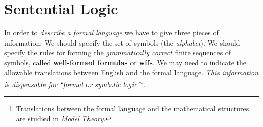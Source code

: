 \documentclass{myproc}
\begin{document}
\small
\pagestyle{empty}


\section{Sentential Logic}
In order to {\em{}describe a formal language\/} we have to give
  three pieces of information:
  \ben
  \w [(a)] We should specify the set of symbols (the {\em{}alphabet\/}).
  \w [(b)] We should specify the rules for forming the 
     {\em{}grammatically correct\/} finite sequences of symbols, 
     called {\bf{}well-formed formulas}
     or {\bf{}wffs}.
     \w [(c)] We may need to indicate the allowable translations between
     English and the formal language. {\em{}This information is
       dispensable for ``formal or symbolic logic''\/}\footnote{Translations 
       between the formal language and the
     mathematical
     structures are studied in {\em{}Model Theory\/}.}.
   \een
\end{document}
